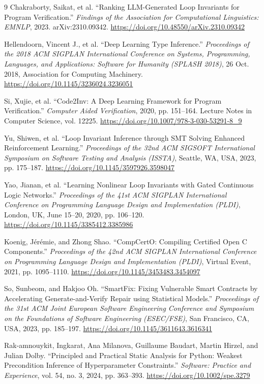 \documentclass[8pt]{extarticle}
\begin{document}
\begin{thebibliography}{9}
 Chakraborty, Saikat, et al. ``Ranking LLM-Generated Loop Invariants for Program Verification.'' \textit{Findings of the Association for Computational Linguistics: EMNLP}, 2023. arXiv:2310.09342. \url{https://doi.org/10.48550/arXiv.2310.09342}

 Hellendoorn, Vincent J., et al. ``Deep Learning Type Inference.'' \textit{Proceedings of the 2018 ACM SIGPLAN International Conference on Systems, Programming, Languages, and Applications: Software for Humanity (SPLASH 2018)}, 26 Oct. 2018, Association for Computing Machinery. \url{https://doi.org/10.1145/3236024.3236051}

 Si, Xujie, et al. ``Code2Inv: A Deep Learning Framework for Program Verification.'' \textit{Computer Aided Verification}, 2020, pp. 151--164. Lecture Notes in Computer Science, vol. 12225. \url{https://doi.org/10.1007/978-3-030-53291-8_9}

 Yu, Shiwen, et al. ``Loop Invariant Inference through SMT Solving Enhanced Reinforcement Learning.'' \textit{Proceedings of the 32nd ACM SIGSOFT International Symposium on Software Testing and Analysis (ISSTA)}, Seattle, WA, USA, 2023, pp. 175--187. \url{https://doi.org/10.1145/3597926.3598047}

 Yao, Jianan, et al. ``Learning Nonlinear Loop Invariants with Gated Continuous Logic Networks.'' \textit{Proceedings of the 41st ACM SIGPLAN International Conference on Programming Language Design and Implementation (PLDI)}, London, UK, June 15--20, 2020, pp. 106--120. \url{https://doi.org/10.1145/3385412.3385986}

 Koenig, Jérémie, and Zhong Shao. ``CompCertO: Compiling Certified Open C Components.'' \textit{Proceedings of the 42nd ACM SIGPLAN International Conference on Programming Language Design and Implementation (PLDI)}, Virtual Event, 2021, pp. 1095--1110. \url{https://doi.org/10.1145/3453483.3454097}

 So, Sunbeom, and Hakjoo Oh. ``SmartFix: Fixing Vulnerable Smart Contracts by Accelerating Generate-and-Verify Repair using Statistical Models.'' \textit{Proceedings of the 31st ACM Joint European Software Engineering Conference and Symposium on the Foundations of Software Engineering (ESEC/FSE)}, San Francisco, CA, USA, 2023, pp. 185--197. \url{https://doi.org/10.1145/3611643.3616341}

 Rak-amnouykit, Ingkarat, Ana Milanova, Guillaume Baudart, Martin Hirzel, and Julian Dolby. ``Principled and Practical Static Analysis for Python: Weakest Precondition Inference of Hyperparameter Constraints.'' \textit{Software: Practice and Experience}, vol. 54, no. 3, 2024, pp. 363--393. \url{https://doi.org/10.1002/spe.3279}


\end{thebibliography}
\end{document}
